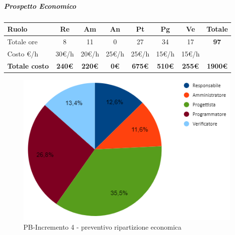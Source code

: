 \subparagraph{Prospetto Economico}
\begin{center}
	\renewcommand{\arraystretch}{1.8} %
	\begin{tabular}{ |m{10em}|c|c|c|c|c|c|c| }
	\hline
	\textbf{Ruolo} & \textbf{Re} & \textbf{Am} &  \textbf{An} &  \textbf{Pt} &  \textbf{Pg} &  \textbf{Ve} &  \textbf{Totale}\\
    \hline
    Totale ore & 8 & 11 & 0 & 27 & 34 & 17 & \textbf{97}\\
    \hline
    Costo \euro/h & 30\euro/h & 20\euro/h & 25\euro/h & 25\euro/h & 15\euro/h & 15\euro/h & \\
    \hline
    \textbf{Totale costo} & \textbf{240\euro} & \textbf{220\euro} &  \textbf{0\euro} &  \textbf{675\euro} &  \textbf{510\euro} &  \textbf{255\euro} &  \textbf{1900\euro}\\
    \hline
	\end{tabular}

    \begin{figure}[H]
       \centering\includegraphics{images/preventivo/PB-incremento4-costo.png}
       \caption{PB-Incremento 4 - preventivo ripartizione economica}
    \end{figure}
\end{center}

\newpage